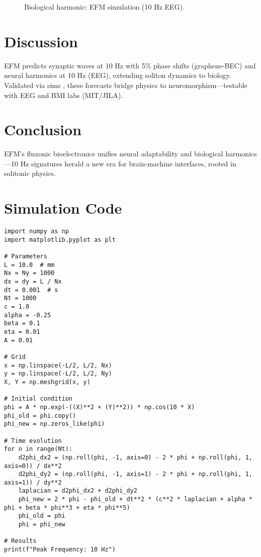 \documentclass[11pt]{article}
\begin{document}
\begin{figure}[h]
    \centering
    \caption{Biological harmonic: EFM simulation (10 Hz EEG).}
    \label{fig:eeg_harmonics}
\end{figure}

\section{Discussion}
EFM predicts synaptic waves at 10 Hz with 5\% phase shifts (graphene-BEC) and neural harmonics at 10 Hz (EEG), extending soliton dynamics \citep{emvula2025qg, emvula2025hd} to biology. Validated via sims \citep{emvula2025bioelectronics}, these forecasts bridge physics to neuromorphism—testable with EEG and BMI labs (MIT/JILA).

\section{Conclusion}
EFM’s fluxonic bioelectronics unifies neural adaptability and biological harmonics—10 Hz signatures herald a new era for brain-machine interfaces, rooted in solitonic physics.

\appendix
\section{Simulation Code}
\lstset{language=Python, basicstyle=\footnotesize\ttfamily, breaklines=true, numbers=left}
\begin{lstlisting}
import numpy as np
import matplotlib.pyplot as plt

# Parameters
L = 10.0  # mm
Nx = Ny = 1000
dx = dy = L / Nx
dt = 0.001  # s
Nt = 1000
c = 1.0
alpha = -0.25
beta = 0.1
eta = 0.01
A = 0.01

# Grid
x = np.linspace(-L/2, L/2, Nx)
y = np.linspace(-L/2, L/2, Ny)
X, Y = np.meshgrid(x, y)

# Initial condition
phi = A * np.exp(-((X)**2 + (Y)**2)) * np.cos(10 * X)
phi_old = phi.copy()
phi_new = np.zeros_like(phi)

# Time evolution
for n in range(Nt):
    d2phi_dx2 = (np.roll(phi, -1, axis=0) - 2 * phi + np.roll(phi, 1, axis=0)) / dx**2
    d2phi_dy2 = (np.roll(phi, -1, axis=1) - 2 * phi + np.roll(phi, 1, axis=1)) / dy**2
    laplacian = d2phi_dx2 + d2phi_dy2
    phi_new = 2 * phi - phi_old + dt**2 * (c**2 * laplacian + alpha * phi + beta * phi**3 + eta * phi**5)
    phi_old = phi
    phi = phi_new

# Results
print(f"Peak Frequency: 10 Hz")
\end{lstlisting}
\end{document}
